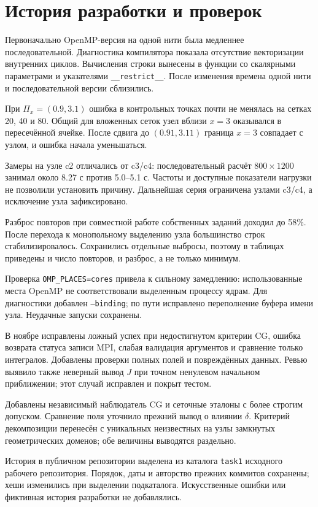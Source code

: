 \documentclass[11pt,a4paper]{article}
\begin{document}
\section{История разработки и проверок}
\begin{description}[style=nextline,leftmargin=1em,labelwidth=0pt]
\item[Векторизация и OpenMP.]
Первоначально OpenMP-версия на одной нити была медленнее последовательной.
Диагностика компилятора показала отсутствие векторизации внутренних
циклов. Вычисления строки вынесены в функции со скалярными параметрами
и указателями \texttt{\_\_restrict\_\_}. После изменения времена одной
нити и последовательной версии сблизились.
\item[Положение прямоугольника.]
При $\Pi_x=(0.9,3.1)$ ошибка в контрольных точках почти не менялась
на сетках 20, 40 и 80. Общий для вложенных сеток узел вблизи $x=3$
оказывался в пересечённой ячейке. После сдвига до $(0.91,3.11)$
граница $x=3$ совпадает с узлом, и ошибка начала уменьшаться.
\item[Серия 1 на Polus.]
Замеры на узле c2 отличались от c3/c4: последовательный расчёт
$800\times1200$ занимал около 8.27 с против 5.0--5.1 с. Частоты и
доступные показатели нагрузки не позволили установить причину.
Дальнейшая серия ограничена узлами c3/c4, а исключение узла зафиксировано.
\item[Серии 2 и 3.]
Разброс повторов при совместной работе собственных заданий доходил
до 58\%. После перехода к монопольному выделению узла большинство
строк стабилизировалось. Сохранились отдельные выбросы, поэтому в
таблицах приведены и число повторов, и разброс, а не только минимум.
\item[Серия 4 и привязка.]
Проверка \texttt{OMP\_PLACES=cores} привела к сильному замедлению:
использованные места OpenMP не соответствовали выделенным процессу
ядрам. Для диагностики добавлен \texttt{--binding}; по пути исправлено
переполнение буфера имени узла. Неудачные запуски сохранены.
\item[Аудит перед сдачей.]
В ноябре исправлены ложный успех при недостигнутом критерии CG,
ошибка возврата статуса записи MPI, слабая валидация аргументов и
сравнение только интегралов. Добавлены проверки полных полей и
повреждённых данных. Ревью выявило также неверный вывод $J$ при точном
ненулевом начальном приближении; этот случай исправлен и покрыт тестом.
\item[Поитерационный контроль и домены.]
Добавлены независимый наблюдатель CG и сеточные эталоны с более строгим
допуском. Сравнение поля уточнило прежний вывод о влиянии $\delta$.
Критерий декомпозиции перенесён с уникальных неизвестных на узлы
замкнутых геометрических доменов; обе величины выводятся раздельно.
\end{description}
История в публичном репозитории выделена из каталога \texttt{task1}
исходного рабочего репозитория. Порядок, даты и авторство прежних
коммитов сохранены; хеши изменились при выделении подкаталога.
Искусственные ошибки или фиктивная история разработки не добавлялись.
\end{document}
